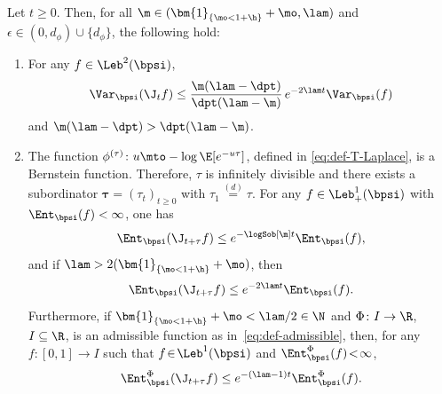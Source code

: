 \begin{theorem}
\label{thm:convergence-equilibrium} Let $t \geq 0$. Then, for all $\m \in (\bm{1}_{\{\mo < 1+\h\}} + \mo ,\lam)$
and $\epsilon \in (0,d_\phi) \cup \{d_\phi\}$, the following hold:
\begin{enumerate}
\item \label{item-1:thm:convergence-equilibrium} For any $f \in \Leb^2(\bpsi)$,
\begin{equation*}
\Var_\bpsi(\J_t f) \leq \frac{\m(\lam-\dpt)}{\dpt(\lam-\m)}\, e^{-2\lam t} \Var_\bpsi(f)
\end{equation*}
and $\m(\lam-\dpt) > \dpt(\lam-\m)$.
\item \label{item-2:thm:convergence-equilibrium}
The function $\phi^{(\tau)} \colon u \mto - \log \E[e^{-u \tau}]$, defined in \eqref{eq:def-T-Laplace}, is a Bernstein function. Therefore,
$\tau$ is infinitely divisible and there exists a subordinator $\bm{\tau} = (\tau_t)_{t \geq 0}$ with $\tau_1 \stackrel{(d)}{=} \tau$. For any $f \in \Leb^1_+(\bpsi)$ with $\Ent_\bpsi(f) < \infty$, one has
\begin{equation*}
\Ent_\bpsi(\J_{t+\tau} f) \leq e^{- \logSob[\m] t} \Ent_\bpsi(f),
\end{equation*}
and if $\lam > 2(\bm{1}_{\{\mo < 1+\h \}} + \mo)$, then
\begin{equation*}
\Ent_\bpsi(\J_{t+\tau} f) \leq e^{- 2 \lam t} \Ent_\bpsi(f).
\end{equation*}
Furthermore, if $\bm{1}_{\{\mo < 1+\h \}} + \mo < \lam/2 \in \N$ and $\Phi \colon I \to \R$, $I \subseteq \R$, is an admissible function as in~\eqref{eq:def-admissible}, then, for any $f \colon [0,1]\!\to\! I$ such that $f \!\in\!\Leb^1(\bpsi)$ and \hbox{$\Ent_\bpsi^\Phi(f)\!<\!\infty$},
\begin{equation*}
\Ent_\bpsi^\Phi(\J_{t+\tau} f) \leq e^{-(\lam-1)t} \Ent_\bpsi^\Phi(f).
\end{equation*}
\end{enumerate}
\end{theorem}

